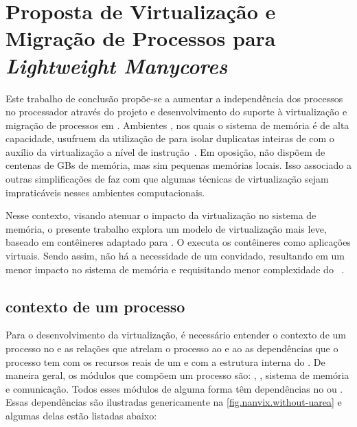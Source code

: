 \glsresetall
\chapter{Proposta de Virtualização e Migração de Processos para \textit{Lightweight Manycores}}
\label{chap.dev.virtualizacao}

Este trabalho de conclusão propõe-se a aumentar a independência dos processos no processador através do projeto e desenvolvimento do suporte à virtualização e migração de processos em \lws. Ambientes \cloud, nos quais o sistema de memória é de alta capacidade, usufruem da utilização de \vms para isolar duplicatas inteiras de \oss com o auxílio da virtualização a nível de instrução~\cite{sharma2016containers}. Em oposição, \lws não dispõem de centenas de GBs de memória, mas sim pequenas memórias locais. Isso associado a outras simplificações de \hardware faz com que algumas técnicas de virtualização sejam impraticáveis nesses ambientes computacionais.


Nesse contexto, visando atenuar o impacto da virtualização no sistema de memória, o presente trabalho explora um modelo de virtualização mais leve, baseado em contêineres adaptado para \lws. O \so executa os contêineres como aplicações virtuais. Sendo assim, não há a necessidade de um \os convidado, resultando em um menor impacto no sistema de memória e requisitando menor complexidade do \hardware~\cite{thalheim2018cntr, sharma2016containers}.


\section{contexto de um processo}

Para o desenvolvimento da virtualização, é necessário entender o contexto de um processo no \nanvix e as relações que atrelam o processo ao \cluster e ao \so \ie as dependências que o processo tem com os recursos reais de um \cluster e com a estrutura interna do \so. De maneira geral, os módulos que compõem um processo são: \threads, \syscalls, sistema de memória e comunicação. Todos esses módulos de alguma forma têm dependências no  ou \cluster. Essas dependências são ilustradas genericamente na \autoref{fig.nanvix.without-uarea} e algumas delas estão listadas abaixo:

